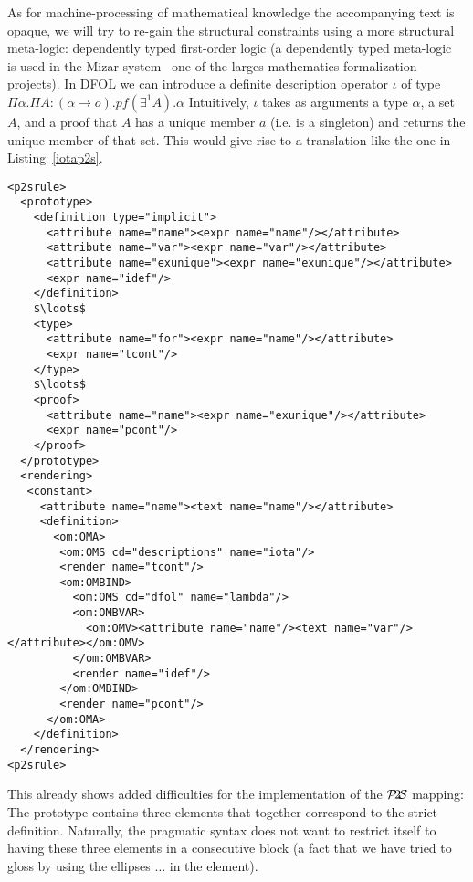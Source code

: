 \documentclass{article}
\def\ptos{\ensuremath{\mathcal{P}\kern-.2em2\kern-.2em\mathcal{S}}}
\begin{document}
As for machine-processing of mathematical knowledge the accompanying text is opaque, we
will try to re-gain the structural constraints using a more structural meta-logic:
dependently typed first-order logic (a dependently typed meta-logic~\cite{Ban:MizarTypes}
is used in the Mizar system~\cite{mizar:online} one of the larges mathematics formalization
projects). In DFOL we can introduce a definite
description operator $\iota$ of type $\Pi\alpha.\Pi A\colon(\alpha\rightarrow
o).pf(\exists^1A).\alpha$ Intuitively,
$\iota$ takes as arguments a type $\alpha$, a set $A$, and a proof that $A$ has a unique
member $a$ (i.e. is a singleton) and returns the unique member of that set. This would
give rise to a translation like the one in Listing~\ref{iotap2s}.
\begin{lstlisting}[label=lst:iotap2s,caption=A Meta Theory for structured implicit definitions,mathescape]
<p2srule>
  <prototype>
    <definition type="implicit">
      <attribute name="name"><expr name="name"/></attribute>
      <attribute name="var"><expr name="var"/></attribute>
      <attribute name="exunique"><expr name="exunique"/></attribute>
      <expr name="idef"/>
    </definition>
    $\ldots$
    <type>
      <attribute name="for"><expr name="name"/></attribute>
      <expr name="tcont"/>
    </type>
    $\ldots$
    <proof>
      <attribute name="name"><expr name="exunique"/></attribute>
      <expr name="pcont"/>
    </proof>
  </prototype> 
  <rendering>
   <constant>
     <attribute name="name"><text name="name"/></attribute>
     <definition>
       <om:OMA>
        <om:OMS cd="descriptions" name="iota"/>
        <render name="tcont"/>
        <om:OMBIND>
          <om:OMS cd="dfol" name="lambda"/>
          <om:OMBVAR>
            <om:OMV><attribute name="name"/><text name="var"/></attribute></om:OMV>
          </om:OMBVAR>
          <render name="idef"/>
        </om:OMBIND>
        <render name="pcont"/>
      </om:OMA>
    </definition>
  </rendering>
<p2srule>
\end{lstlisting}
This already shows added difficulties for the implementation of the $\ptos$ mapping: The
prototype contains three elements that together correspond to the strict
definition. Naturally, the pragmatic syntax does not want to restrict itself to having
these three elements in a consecutive block (a fact that we have tried to gloss by using
the ellipses $\ldots$ in the {} element).
\end{document}
